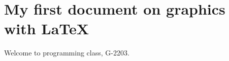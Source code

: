 \documentclass{report}
\begin{document}
\section{My first document on graphics with \LaTeX}

Welcome to programming class, 
G-2203. 
\end{document}
